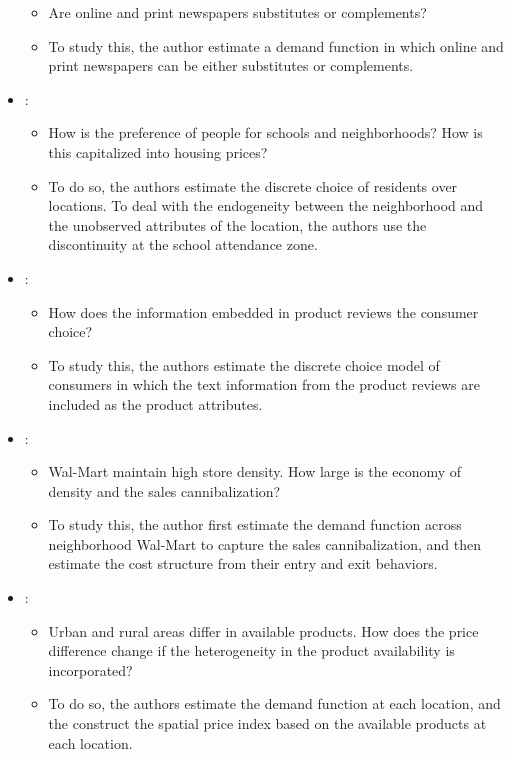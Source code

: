 \documentclass[
]{book}
\providecommand{\tightlist}{%
  \setlength{\itemsep}{0pt}\setlength{\parskip}{0pt}}
\begin{document}
\begin{itemize}
  \begin{itemize}
  \tightlist
  \item
    Are online and print newspapers substitutes or complements?
  \item
    To study this, the author estimate a demand function in which online and print newspapers can be either substitutes or complements.
  \end{itemize}
\item
  \citet{Bayer2007}:

  \begin{itemize}
  \tightlist
  \item
    How is the preference of people for schools and neighborhoods? How is this capitalized into housing prices?
  \item
    To do so, the authors estimate the discrete choice of residents over locations. To deal with the endogeneity between the neighborhood and the unobserved attributes of the location, the authors use the discontinuity at the school attendance zone.
  \end{itemize}
\item
  \citet{Archak2011}:

  \begin{itemize}
  \tightlist
  \item
    How does the information embedded in product reviews the consumer choice?
  \item
    To study this, the authors estimate the discrete choice model of consumers in which the text information from the product reviews are included as the product attributes.
  \end{itemize}
\item
  \citet{Holmes2011}:

  \begin{itemize}
  \tightlist
  \item
    Wal-Mart maintain high store density. How large is the economy of density and the sales cannibalization?
  \item
    To study this, the author first estimate the demand function across neighborhood Wal-Mart to capture the sales cannibalization, and then estimate the cost structure from their entry and exit behaviors.
  \end{itemize}
\item
  \citet{Handbury2014}:

  \begin{itemize}
  \tightlist
  \item
    Urban and rural areas differ in available products. How does the price difference change if the heterogeneity in the product availability is incorporated?
  \item
    To do so, the authors estimate the demand function at each location, and the construct the spatial price index based on the available products at each location.
  \end{itemize}
\end{itemize}
\end{document}
